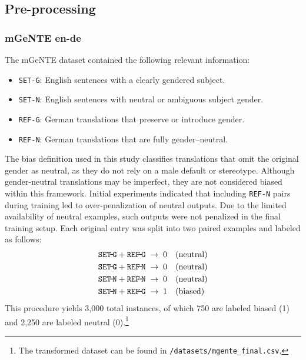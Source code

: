 \subsection{Pre-processing}

\subsubsection{mGeNTE en-de} 
The mGeNTE dataset contained the following relevant information:  

\begin{itemize}  
  \item \texttt{SET-G}: English sentences with a clearly gendered subject.  
  \item \texttt{SET-N}: English sentences with neutral or ambiguous subject gender.  
  \item \texttt{REF-G}: German translations that preserve or introduce gender.  
  \item \texttt{REF-N}: German translations that are fully gender–neutral.  
\end{itemize}  

\noindent
The bias definition used in this study classifies translations that omit the original gender as neutral, as they do not rely on a male default or stereotype. Although gender-neutral translations may be imperfect, they are not considered biased within this framework. Initial experiments indicated that including \texttt{REF-N} pairs during training led to over-penalization of neutral outputs. Due to the limited availability of neutral examples, such outputs were not penalized in the final training setup. Each original entry was split into two paired examples and labeled as follows:  
\[
\begin{aligned}
\texttt{SET\!-\!G} + \texttt{REF\!-\!G} &\;\rightarrow\; 0 \quad(\text{neutral})\\
\texttt{SET\!-\!G} + \texttt{REF\!-\!N} &\;\rightarrow\; 0 \quad(\text{neutral})\\
\texttt{SET\!-\!N} + \texttt{REF\!-\!N} &\;\rightarrow\; 0 \quad(\text{neutral})\\
\texttt{SET\!-\!N} + \texttt{REF\!-\!G} &\;\rightarrow\; 1 \quad(\text{biased})
\end{aligned}
\]  
This procedure yields 3,000 total instances, of which 750 are labeled biased (1) and 2,250 are labeled neutral (0).\footnote{The transformed dataset can be found in \texttt{/datasets/mgente\_final.csv}.} 

